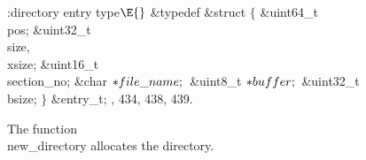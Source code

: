 \Y\B\4:directory entry type\X${}\E{}$\6
\&{typedef} \&{struct} ${}\{{}$\1\6
\&{uint64\_t} \\{pos};\6
\&{uint32\_t} \\{size}${},{}$ \\{xsize};\6
\&{uint16\_t} \\{section\_no};\6
\&{char} ${}{*}\index{file name+\\{file\_name}}\\{file\_name};{}$\6
\&{uint8\_t} ${}{*}\index{buffer+\\{buffer}}\\{buffer};{}$\6
\&{uint32\_t} \\{bsize};\2\6
${}\}{}$ \&{entry\_t};
, 434, 438, 439.\Y
\fi



The function \\{new\_directory} allocates the directory.

